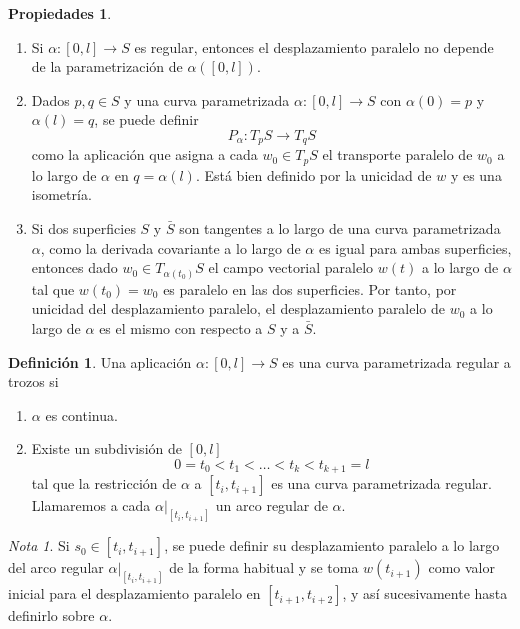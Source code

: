 \documentclass{report}
\theoremstyle{remark}
\theoremstyle{remark}
\newtheorem*{note}{Nota}
\theoremstyle{definition}
\newtheorem{definition}{Definición}[chapter]
\theoremstyle{definition}
\newtheorem*{properties}{Propiedades}
\theoremstyle{definition}
\begin{document}
\begin{properties}
    \hfill
    \begin{enumerate}
        \item Si $\alpha : [0, l] \to S$ es regular, entonces el desplazamiento paralelo no depende de la parametrización de $\alpha([0, l])$.
        \item Dados $p, q \in S$ y una curva parametrizada $\alpha: [0, l] \to S$ con $\alpha(0) = p$ y $\alpha(l) = q$, se puede definir
              $$P_\alpha : T_pS \to T_qS$$
              como la aplicación que asigna a cada $w_0 \in T_pS$ el transporte paralelo de $w_0$ a lo largo de $\alpha$ en $q = \alpha(l)$.
              Está bien definido por la unicidad de $w$ y es una isometría.
        \item Si dos superficies $S$ y $\bar{S}$ son tangentes a lo largo de una curva parametrizada $\alpha$, como la derivada covariante a lo largo de $\alpha$ es igual para ambas superficies, entonces dado $w_0 \in T_{\alpha(t_0)}S$ el campo vectorial paralelo $w(t)$ a lo largo de $\alpha$ tal que $w(t_0) = w_0$ es paralelo en las dos superficies.
              Por tanto, por unicidad del desplazamiento paralelo, el desplazamiento paralelo de $w_0$ a lo largo de $\alpha$ es el mismo con respecto a $S$ y a $\bar{S}$.
    \end{enumerate}
\end{properties}

\begin{definition}
    Una aplicación $\alpha : [0, l] \to S$ es una curva parametrizada regular a trozos si
    \begin{enumerate}
        \item $\alpha$ es continua.
        \item Existe un subdivisión de $[0, l]$
              $$0 = t_0 < t_1 < \dots < t_k < t_{k+1} = l$$
              tal que la restricción de $\alpha$ a $[t_i, t_{i+1}]$ es una curva parametrizada regular.
              Llamaremos a cada $\alpha |_{[t_i, t_{i+1}]}$ un arco regular de $\alpha$.
    \end{enumerate}
\end{definition}

\begin{note}
    Si $s_0 \in [t_i, t_{i+1}]$, se puede definir su desplazamiento paralelo a lo largo del arco regular $\alpha |_{[t_i, t_{i+1}]}$ de la forma habitual y se toma $w(t_{i+1})$ como valor inicial para el desplazamiento paralelo en $[t_{i+1}, t_{i+2}]$, y así sucesivamente hasta definirlo sobre $\alpha$.
\end{note}
\end{document}
